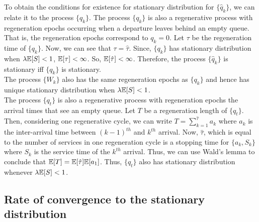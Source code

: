 \documentclass[all-lectures.tex]{subfiles}
\begin{document}
\indent To obtain the conditions for existence for stationary distribution for $\{\hat{q}_k\}$, we can relate it to the process $\{q_k\}$. The process $\{q_k\}$ is also a regenerative process with regeneration epochs occurring when a departure leaves behind an empty queue. That is, the regeneration epochs correspond to $q_k = 0$. Let $\tau$ be the regeneration time of $\{q_k\}$. Now, we can see that $\tau = \hat{\tau}$. Since, $\{q_k\}$ has stationary distribution when $\lambda \mathbb{E}[S] < 1$, $\mathbb{E}[\tau] < \infty$. So, $\mathbb{E}[\hat{\tau}] < \infty$. Therefore, the process $\{\hat{q}_k\}$ is stationary iff $\{q_k\}$ is stationary. \\
\indent The process $\{W_k\}$ also has the same regeneration epochs as $\{q_k\}$ and hence has unique stationary distribution when $\lambda\mathbb{E}[S] < 1$.\\
\indent The process $\{q_t\}$ is also a regenerative process with regeneration epochs the arrival times that see an empty queue. Let $T$ be a regeneration length of $\{q_t\}$. Then, considering one regenerative cycle, we can write $T = \sum_{k = 1}^{\hat{\tau}} a_k$ where $a_k$ is the inter-arrival time between $(k-1)^{th}$ and $k^{th}$ arrival. Now, $\hat{\tau}$, which is equal to the number of services in one regeneration cycle is a stopping time for $\{a_k,S_k\}$ where $S_k$ is the service time of the $k^{th}$ arrival. Thus, we can use Wald's lemma to conclude that $\mathbb{E}[T] = \mathbb{E}[\hat{\tau}] \mathbb{E}[a_1]$. Thus, $\{q_t\}$ also has stationary distribution whenever $\lambda\mathbb{E}[S] < 1$.
\subsection{Rate of convergence to the stationary distribution}
\end{document}

